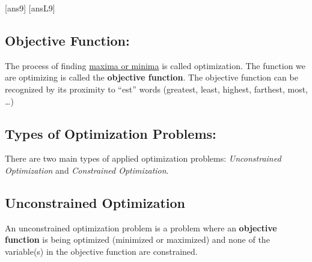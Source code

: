 \newpage
[ans9]
[ansL9]
\subsection*{Objective Function:}
The process of finding \underline{maxima or minima} is called optimization. The function we are optimizing is called the \textbf{objective function}. The objective function can be recognized by its proximity to “est” words (greatest, least, highest, farthest, most, …)

\subsection*{Types of Optimization Problems:}

There are two main types of applied optimization problems: \emph{Unconstrained Optimization} and \emph{Constrained Optimization}.

\subsection*{Unconstrained Optimization}
An unconstrained optimization problem is  a problem where an \textbf{objective function} is being optimized (minimized or maximized) and none of the variable(s) in the objective function are constrained.

